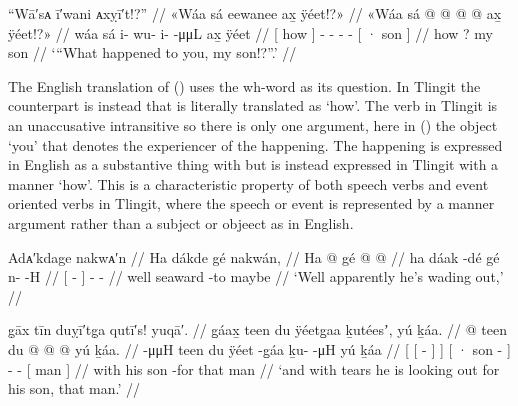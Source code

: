 \ex\label{ex:100-31-what-happened}%
%
\begingl
	\glpreamble	“Wā′sᴀ ī′wani ᴀxỵī′t!?” //
	\glpreamble	«\!Wáa sá eewanee ax̱ ÿéet\!!?\!» //
	\gla	{} «\!Wáa sá {} 
		 @ {} @ {} @ {} @ {}
		{} ax̱ ÿéet\!!?\!» {} //
	\glb	{} \pqp{}wáa sá {}
		i- wu- i-  -μμL
		{} ax̱ ÿéet {} //
	\glc	{}[ \pqp{}how  {}]
		- - -  -
		{}[ · son {}] //
	\gld	{} \pqp{}how ? {}
		 {} {} {} {} {} my son //
	\glft	‘“What happened to you, my son!?”.’
		//
\endgl
\xe

The English translation of (\lastx) uses the wh-word  as its question.
In Tlingit the counterpart is instead  that is literally translated as ‘how’.
The verb  in Tlingit is an unaccusative intransitive so there is only one argument, here in (\lastx) the object  ‘you’ that denotes the experiencer of the happening.
The happening is expressed in English as a substantive thing with  but is instead expressed in Tlingit with a manner  ‘how’.
This is a characteristic property of both speech verbs and event oriented verbs in Tlingit, where the speech or event is represented by a manner argument rather than a subject or objeect as in English.

\ex\label{ex:100-32-wading-out}%
%
\begingl
	\glpreamble	Adᴀ′kdage nakwᴀ′n //
	\glpreamble	Ha dákde gé nakwán, //
	\gla	Ha {}  @ {} {} gé 
		 @ {} @ {} //
	\glb	ha {} dáak -dé {} gé
		n-  -H //
	\glc	{} {}[  - {}] 
		-  - //
	\gld	well {} seaward -to {} maybe
		 {} {} //
	\glft	‘Well apparently he’s wading out,’
		//
\endgl
\xe

\ex\label{ex:100-33-crying-searching}%
%
\begingl
	\glpreamble	g̣āx tīn duỵī′tg̣a qutī′s! yuqā′. //
	\glpreamble	g̱áax̱ teen du ÿéetg̱aa ḵutéesʼ, yú ḵáa. //
	\gla	{} {}  @ {} {} teen {}
		{} du  @ {} {}
		 @ {} @ {}
		{} yú ḵáa. {} //
	\glb	{} {}  -μμH {} teen {}
		{} du ÿéet -g̱áa {}
		ḵu-  -μH
		{} yú ḵáa {} //
	\glc	{}[ {}[  - {}]  {}]
		{}[ · son - {}]
		-  -
		{}[  man {}] //
	\gld	{} {}  {} {} with {}
		{} his son -for {}
		 {} {}
		{} that man {} //
	\glft	‘and with tears he is looking out for his son, that man.’
		//
\endgl
\xe

